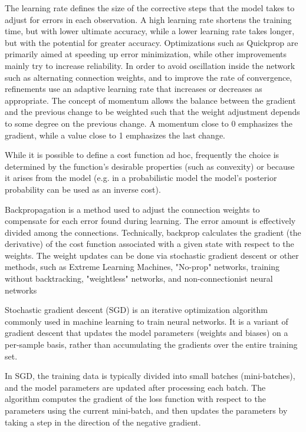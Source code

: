 The learning rate defines the size of the corrective steps that the model takes to adjust for errors in each observation. A high learning rate shortens the training time, but with lower ultimate accuracy, while a lower learning rate takes longer, but with the potential for greater accuracy. Optimizations such as Quickprop are primarily aimed at speeding up error minimization, while other improvements mainly try to increase reliability. In order to avoid oscillation inside the network such as alternating connection weights, and to improve the rate of convergence, refinements use an adaptive learning rate that increases or decreases as appropriate. The concept of momentum allows the balance between the gradient and the previous change to be weighted such that the weight adjustment depends to some degree on the previous change. A momentum close to 0 emphasizes the gradient, while a value close to 1 emphasizes the last change.

While it is possible to define a cost function ad hoc, frequently the choice is determined by the function's desirable properties (such as convexity) or because it arises from the model (e.g. in a probabilistic model the model's posterior probability can be used as an inverse cost).

Backpropagation is a method used to adjust the connection weights to compensate for each error found during learning. The error amount is effectively divided among the connections. Technically, backprop calculates the gradient (the derivative) of the cost function associated with a given state with respect to the weights. The weight updates can be done via stochastic gradient descent or other methods, such as Extreme Learning Machines, "No-prop" networks, training without backtracking, "weightless" networks, and non-connectionist neural networks

Stochastic gradient descent (SGD) is an iterative optimization algorithm commonly used in machine learning to train neural networks. It is a variant of gradient descent that updates the model parameters (weights and biases) on a per-sample basis, rather than accumulating the gradients over the entire training set.

In SGD, the training data is typically divided into small batches (mini-batches), and the model parameters are updated after processing each batch. The algorithm computes the gradient of the loss function with respect to the parameters using the current mini-batch, and then updates the parameters by taking a step in the direction of the negative gradient.

